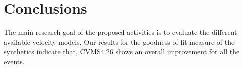 
\section{Conclusions}

The main research goal of the proposed activities is to evaluate the different available velocity models.
Our results for the goodness-of fit measure of the synthetics indicate that, CVMS4.26 shows an overall improvement for all the events.   
